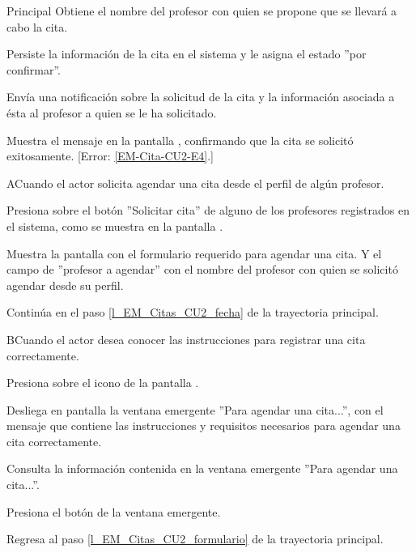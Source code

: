 \begin{UCtrayectoria}{Principal}
	\UCpaso Obtiene el nombre del profesor con quien se propone que se llevará a cabo la cita.

	\UCpaso Persiste la información de la cita en el sistema y le asigna el estado ''por confirmar''.

	\UCpaso Envía una notificación sobre la solicitud de la cita y la información asociada a ésta al profesor a quien se le ha solicitado.

	\UCpaso Muestra el mensaje  en la pantalla , confirmando que la cita se solicitó exitosamente. [Error: \ref{EM-Cita-CU2-E4}.]

\end{UCtrayectoria}

\begin{UCtrayectoriaA}{A}{Cuando el actor solicita agendar una cita desde el perfil de algún profesor.}

	\UCpaso [\UCactor] Presiona sobre el botón ''Solicitar cita'' de alguno de los profesores registrados en el sistema, como se muestra en la pantalla .

	\UCpaso Muestra la pantalla  con el formulario requerido para agendar una cita. Y el campo de ''profesor a agendar'' con el nombre del profesor con quien se solicitó agendar desde su perfil.

	\UCpaso Continúa en el paso \ref{l_EM_Citas_CU2_fecha} de la trayectoria principal.

\end{UCtrayectoriaA}

\begin{UCtrayectoriaA}{B}{Cuando el actor desea conocer las instrucciones para registrar una cita correctamente.}

	\UCpaso Presiona sobre el icono  de la pantalla .

	\UCpaso Desliega en pantalla la ventana emergente ''Para agendar una cita...'', con el mensaje  que contiene las instrucciones y requisitos necesarios para agendar una cita correctamente.

	\UCpaso [\UCactor] Consulta la información contenida en la ventana emergente ''Para agendar una cita...''.

	\UCpaso [\UCactor] Presiona el botón  de la ventana emergente.

	\UCpaso Regresa al paso \ref{l_EM_Citas_CU2_formulario} de la trayectoria principal. 

\end{UCtrayectoriaA}

